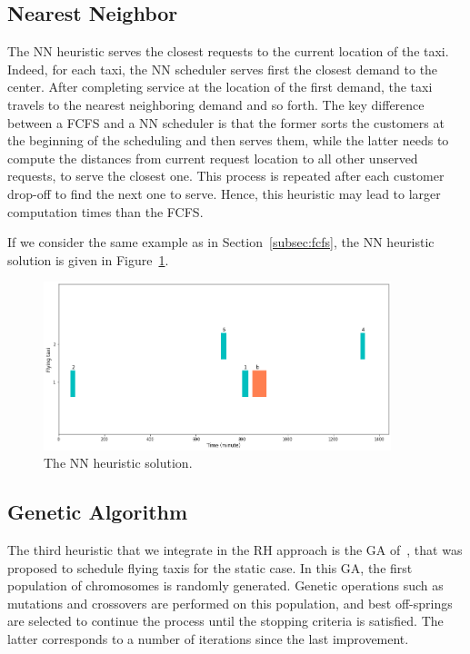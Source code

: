 \subsection{Nearest Neighbor}
\label{subsec:nn}

The \acs{NN} heuristic serves the closest requests to the current location of the taxi. Indeed, for each taxi, the \acs{NN} scheduler serves first the closest demand to the center. After completing service at the location of the first demand, the taxi travels to the nearest neighboring demand and so forth. The key difference between a \acs{FCFS} and a \acs{NN} scheduler is that the former sorts the customers at the beginning of the scheduling and then serves them, while the latter needs to compute the distances from current request location to all other unserved requests, to serve the closest one. This process is repeated after each customer drop-off to find the next one to serve. Hence, this heuristic may lead to larger computation times than the \acs{FCFS}.

If we consider the same example as in Section~\ref{subsec:fcfs}, the \acs{NN} heuristic solution is given in Figure~\ref{fig:example-nn}.

\begin{figure}[h!]
	\centering
	\includegraphics[width=0.9\textwidth]{images/example-nn}
	\caption{The \acs{NN} heuristic solution.}
	\label{fig:example-nn}
\end{figure}


\subsection{Genetic Algorithm}
\label{subsec:dynamic-ga}

The third heuristic that we integrate in the \acs{RH} approach is the \acs{GA} of~\cite{panwadee2021}, that was proposed to schedule flying taxis for the static case. In this \acs{GA}, the first population of chromosomes is randomly generated. Genetic operations such as mutations and crossovers are performed on this population, and best off-springs are selected to continue the process until the stopping criteria is satisfied. The latter corresponds to a number of iterations since the last improvement.


